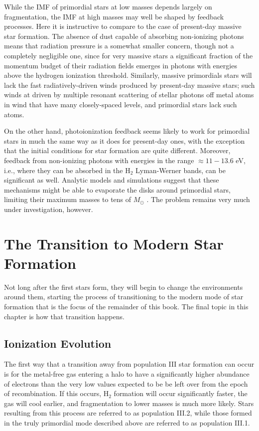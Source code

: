While the IMF of primordial stars at low masses depends largely on fragmentation, the IMF at high masses may well be shaped by feedback processes. Here it is instructive to compare to the case of present-day massive star formation. The absence of dust capable of absorbing non-ionizing photons means that radiation pressure is a somewhat smaller concern, though not a completely negligible one, since for very massive stars a significant fraction of the momentum budget of their radiation fields emerges in photons with energies above the hydrogen ionization threshold. Similarly, massive primordials stars will lack the fast radiatively-driven winds produced by present-day massive stars; such winds at driven by multiple resonant scattering of stellar photons off metal atoms in wind that have many closely-spaced levels, and primordial stars lack such atoms.

On the other hand, photoionization feedback seems likely to work for primordial stars in much the same way as it does for present-day ones, with the exception that the initial conditions for star formation are quite different. Moreover, feedback from non-ionizing photons with energies in the range $\approx 11-13.6$ eV, i.e., where they can be absorbed in the H$_2$ Lyman-Werner bands, can be significant as well. Analytic models and simulations suggest that these mechanisms might be able to evaporate the disks around primordial stars, limiting their maximum masses to tens of $M_\odot$ \citep{mckee08a, hosokawa11b, stacy12a}. The problem remains very much under investigation, however.


\section{The Transition to Modern Star Formation}

Not long after the first stars form, they will begin to change the environments around them, starting the process of transitioning to the modern mode of star formation that is the focus of the remainder of this book. The final topic in this chapter is how that transition happens.

\subsection{Ionization Evolution}

The first way that a transition away from population III star formation can occur is for the metal-free gas entering a halo to have a significantly higher abundance of electrons than the very low values expected to be be left over from the epoch of recombination. If this occurs, H$_2$ formation will occur significantly faster, the gas will cool earlier, and fragmentation to lower masses is much more likely. Stars resulting from this process are referred to as population III.2, while those formed in the truly primordial mode described above are referred to as population III.1.

